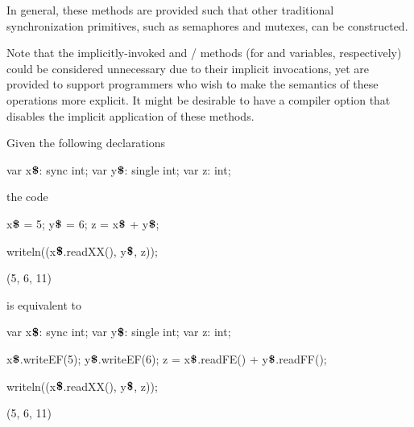 \begin{rationale}
In general, these methods are provided such that other traditional
synchronization primitives, such as semaphores and mutexes, can be
constructed.

Note that the implicitly-invoked 
and / methods (for 
and  variables, respectively) could be considered
unnecessary due to their implicit invocations, yet are provided to
support programmers who wish to make the semantics of these operations
more explicit.  It might be desirable to have a compiler option that
disables the implicit application of these methods.

\end{rationale}

\begin{example}
Given the following declarations
\begin{chapelpre}
\end{chapelpre}
\begin{chapel}
var x$\mbox{{\bf \$}}$: sync int;
var y$\mbox{{\bf \$}}$: single int;
var z: int;
\end{chapel}
the code
\begin{chapel}
x$\mbox{{\bf \$}}$ = 5;
y$\mbox{{\bf \$}}$ = 6;
z = x$\mbox{{\bf \$}}$ + y$\mbox{{\bf \$}}$;
\end{chapel}
\begin{chapelpost}
writeln((x$\mbox{{\bf \$}}$.readXX(), y$\mbox{{\bf \$}}$, z));
\end{chapelpost}
\begin{chapeloutput}
(5, 6, 11)
\end{chapeloutput}
is equivalent to
\begin{chapelpre}
var x$\mbox{{\bf \$}}$: sync int;
var y$\mbox{{\bf \$}}$: single int;
var z: int;
\end{chapelpre}
\begin{chapel}
x$\mbox{{\bf \$}}$.writeEF(5);
y$\mbox{{\bf \$}}$.writeEF(6);
z = x$\mbox{{\bf \$}}$.readFE() + y$\mbox{{\bf \$}}$.readFF();
\end{chapel}
\begin{chapelpost}
writeln((x$\mbox{{\bf \$}}$.readXX(), y$\mbox{{\bf \$}}$, z));
\end{chapelpost}
\begin{chapeloutput}
(5, 6, 11)
\end{chapeloutput}
\end{example}

